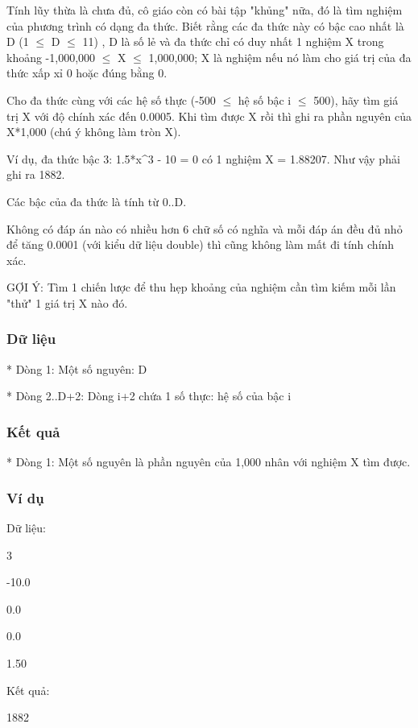 



   Tính lũy thừa là chưa đủ, cô giáo còn có bài tập "khủng" nữa, đó là tìm nghiệm của phương trình có dạng đa thức. Biết rằng các đa thức này có bậc cao nhất là D (1  $\le$  D  $\le$  11) , D là số lẻ và đa thức chỉ có duy nhất 1 nghiệm X trong khoảng -1,000,000  $\le$  X  $\le$  1,000,000; X là nghiệm nếu nó làm cho giá trị của đa thức xấp xỉ 0 hoặc đúng bằng 0.  

   Cho đa thức cùng với các hệ số thực (-500  $\le$  hệ số bậc i  $\le$  500), hãy tìm giá trị X với độ chính xác đến 0.0005. Khi tìm được X rồi thì ghi ra phần nguyên của X*1,000 (chú ý không làm tròn X).  

   Ví dụ, đa thức bậc 3: 1.5*x^3 - 10 = 0 có 1 nghiệm X = 1.88207. Như vậy phải ghi ra 1882.  

   Các bậc của đa thức là tính từ 0..D.   




   Không có đáp án nào có nhiều hơn 6 chữ số có nghĩa và mỗi đáp án đều đủ nhỏ  để tăng 0.0001 (với kiểu dữ liệu double) thì cũng không làm mất đi tính chính xác.  

   GỢI Ý: Tìm 1 chiến lược để thu hẹp khoảng của nghiệm cần tìm kiếm mỗi lần "thử" 1 giá trị X nào đó.  

\subsubsection{   Dữ liệu  }

   * Dòng 1: Một số nguyên: D  

   * Dòng 2..D+2: Dòng i+2 chứa 1 số thực: hệ số của bậc i  

\subsubsection{   Kết quả  }

   * Dòng 1: Một số nguyên là phần nguyên của 1,000 nhân với nghiệm X tìm được.  

\subsubsection{   Ví dụ  }

   Dữ liệu:  

   3   


   -10.0   


   0.0   


   0.0   


   1.50   







   Kết quả:  

   1882  
